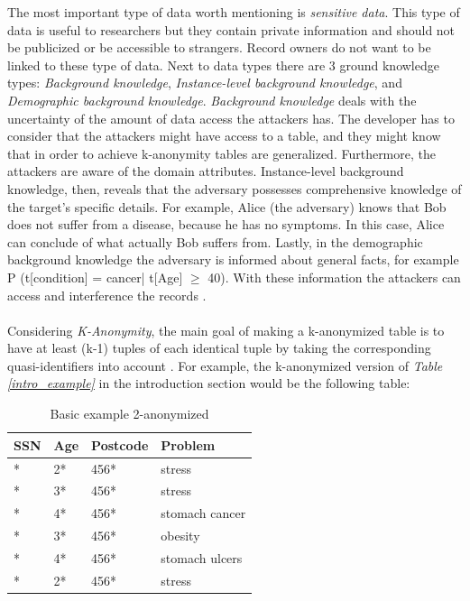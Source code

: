 \documentclass{llncs}
\begin{document}
The most important type of data worth mentioning is \textit{sensitive data}. This type of data is useful to researchers but they contain private information and should not be publicized or be accessible to strangers. Record owners do not want to be linked to these type of data. Next to data types there are 3 ground knowledge types: \textit{Background knowledge}, \textit{Instance-level background knowledge}, and \textit{Demographic background knowledge}. \textit{Background knowledge} deals with the uncertainty of the amount of data access the attackers has. The developer has to consider that the attackers might have access to a table, and they might know that in order to achieve k-anonymity tables are generalized. Furthermore, the attackers are aware of the domain attributes. Instance-level background knowledge, then, reveals that the adversary possesses comprehensive knowledge of the target’s specific details. For example, Alice (the adversary) knows that Bob does not suffer from a disease, because he has no symptoms. In this case, Alice can conclude of what actually Bob suffers from. Lastly, in the demographic background knowledge the adversary is informed about general facts, for example P (t[condition] = cancer| t[Age] $\geq$ 40). With these information the attackers can access and interference the records \cite{ldiversity}.\\\\
Considering \textit{K-Anonymity}, the main goal of making a k-anonymized table is to have at least (k-1) tuples of each identical tuple by taking the corresponding quasi-identifiers into account  \cite{sweeney2002k,li2006achieving}. For example, the k-anonymized version of \textit{Table  \ref{intro_example}} in the introduction section would be the following table:
\begin{table}[]
	\centering
	\caption{Basic example 2-anonymized}
	\label{intro_example_sol}
	\begin{tabular}{@{}llll@{}}
		\toprule
		SSN         & Age & Postcode & Problem         \\ \midrule
		* & 2*  & 456*     & stress \\
		* & 3*  & 456*     & stress          \\
		* & 4*  & 456*     & stomach cancer  \\
		* & 3*  & 456*     & obesity         \\
		* & 4*  & 456*     & stomach ulcers  \\
		* & 2*  & 456*     & stress          \\ \bottomrule
	\end{tabular}
\end{table}\\
\end{document}
